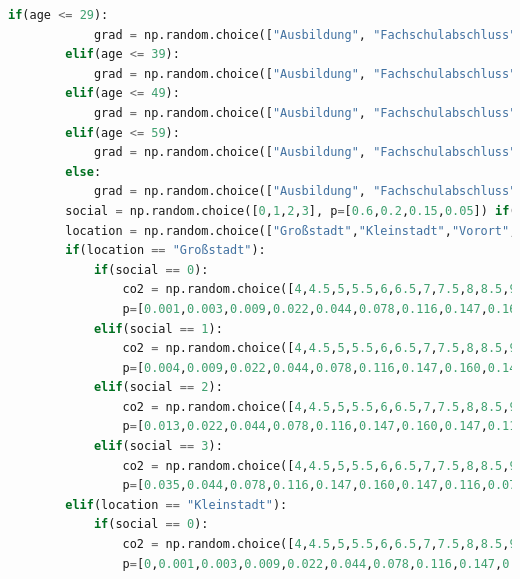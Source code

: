 \documentclass[a4paper,12pt]{report}
\begin{document}
\begin{lstlisting}[language=Python,label={lst:Sz2Z3},caption=Dritte Zelle für das Generieren der Daten]
        if(age <= 29):
            grad = np.random.choice(["Ausbildung", "Fachschulabschluss", "Bachelor", "Master", "Diplom", "Promotion","ohne"], p=[0.425,0.081,0.117,0.071,0.059,0.003,0.244])
        elif(age <= 39):
            grad = np.random.choice(["Ausbildung", "Fachschulabschluss", "Bachelor", "Master", "Diplom", "Promotion","ohne"], p=[0.452,0.091,0.059,0.052,0.157,0.016,0.173])
        elif(age <= 49):
            grad = np.random.choice(["Ausbildung", "Fachschulabschluss", "Bachelor", "Master", "Diplom", "Promotion","ohne"], p=[0.516,0.097,0.014,0.011,0.179,0.017,0.166])
        elif(age <= 59):
            grad = np.random.choice(["Ausbildung", "Fachschulabschluss", "Bachelor", "Master", "Diplom", "Promotion","ohne"], p=[0.559,0.113,0.005,0.003,0.159,0.014,0.147])
        else:
            grad = np.random.choice(["Ausbildung", "Fachschulabschluss", "Bachelor", "Master", "Diplom", "Promotion","ohne"], p=[0.544,0.096,0.002,0.001,0.132,0.012,0.213])
        social = np.random.choice([0,1,2,3], p=[0.6,0.2,0.15,0.05]) if(politics=="Mitte") else np.random.choice([0,1,2,3], p=[0.4,0.25,0.25,0.1]) if(politics=="Links") else np.random.choice([0,1,2,3], p=[0.75,0.15,0.09,0.01])
        location = np.random.choice(["Großstadt","Kleinstadt","Vorort","Ländlich"], p=[0.5952,0.266,0.085,0.0538])
        if(location == "Großstadt"):
            if(social == 0):
                co2 = np.random.choice([4,4.5,5,5.5,6,6.5,7,7.5,8,8.5,9,9.5,10,10.5,11,11.5,12], 
                p=[0.001,0.003,0.009,0.022,0.044,0.078,0.116,0.147,0.160,0.147,0.116,0.078,0.044,0.022,0.009,0.003,0.001])
            elif(social == 1):
                co2 = np.random.choice([4,4.5,5,5.5,6,6.5,7,7.5,8,8.5,9,9.5,10,10.5,11,11.5,12], 
                p=[0.004,0.009,0.022,0.044,0.078,0.116,0.147,0.160,0.147,0.116,0.078,0.044,0.022,0.009,0.003,0.001,0])
            elif(social == 2):
                co2 = np.random.choice([4,4.5,5,5.5,6,6.5,7,7.5,8,8.5,9,9.5,10,10.5,11,11.5,12], 
                p=[0.013,0.022,0.044,0.078,0.116,0.147,0.160,0.147,0.116,0.078,0.044,0.022,0.009,0.003,0.001,0,0])
            elif(social == 3):
                co2 = np.random.choice([4,4.5,5,5.5,6,6.5,7,7.5,8,8.5,9,9.5,10,10.5,11,11.5,12], 
                p=[0.035,0.044,0.078,0.116,0.147,0.160,0.147,0.116,0.078,0.044,0.022,0.009,0.003,0.001,0,0,0])
        elif(location == "Kleinstadt"):
            if(social == 0):
                co2 = np.random.choice([4,4.5,5,5.5,6,6.5,7,7.5,8,8.5,9,9.5,10,10.5,11,11.5,12], 
                p=[0,0.001,0.003,0.009,0.022,0.044,0.078,0.116,0.147,0.160,0.147,0.116,0.078,0.044,0.022,0.009,0.004])

\end{lstlisting}
\end{document}
